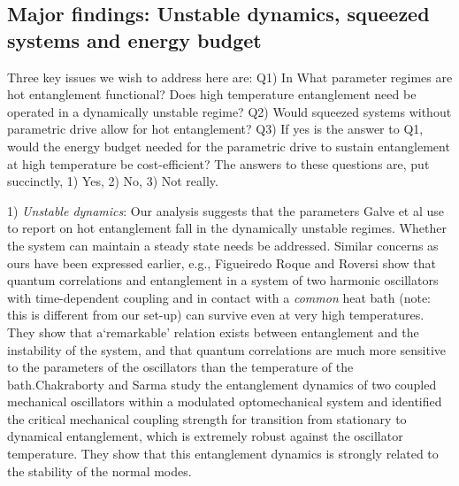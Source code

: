 \documentclass[11pt,a4paper]{article}
\begin{document}
\subsection{Major findings: Unstable dynamics, squeezed systems and energy budget}

Three key issues we wish to address here are: Q1) In What parameter regimes are hot entanglement functional? Does high temperature entanglement need be operated in a dynamically unstable regime?  Q2) Would squeezed systems without parametric drive allow for hot entanglement? Q3) If yes is the answer to Q1, would the energy budget needed for the parametric drive to sustain entanglement at high temperature be cost-efficient?  The answers to these questions are, put succinctly, 1) Yes, 2) No,  3) Not really.
 
 
1) \textit{Unstable dynamics}:  Our analysis suggests that the parameters  Galve et al use to report on hot entanglement fall in the dynamically unstable regimes. Whether the system can maintain a steady state needs be addressed.  Similar concerns as ours  have been expressed earlier, e.g., {Figueiredo Roque and Roversi} \cite{FigFov13} show that quantum correlations and entanglement in a system of two harmonic oscillators with time-dependent coupling and in contact with a {\it common} heat bath (note: this is different from our set-up) can survive  even at very high temperatures. They show that a`remarkable' relation exists between entanglement and the instability of the system, and that quantum correlations are much more sensitive to the parameters of the oscillators than the temperature of the bath.Chakraborty  and  Sarma \cite{ChaSar18} study the entanglement dynamics of two coupled mechanical oscillators within a modulated optomechanical system and identified  the critical mechanical coupling strength for transition from stationary to dynamical entanglement, which is extremely robust against the oscillator temperature. They show that this entanglement dynamics is strongly related to the stability of the normal modes. 
\end{document}
